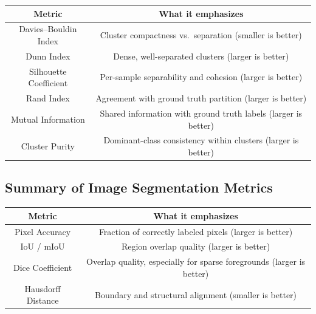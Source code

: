 \documentclass{article}
\begin{document}
\begin{center}
\begin{tabular}{| c | c |}
\hline
\textbf{Metric} & \textbf{What it emphasizes} \\ 
\hline

Davies--Bouldin Index & Cluster compactness vs.\ separation (smaller is better) \\  
\hline

Dunn Index & Dense, well-separated clusters (larger is better) \\
\hline

Silhouette Coefficient & Per-sample separability and cohesion (larger is better) \\
\hline

Rand Index & Agreement with ground truth partition (larger is better) \\
\hline

Mutual Information & Shared information with ground truth labels (larger is better) \\
\hline

Cluster Purity & Dominant-class consistency within clusters (larger is better) \\
\hline

\end{tabular}
\end{center}



\subsection{Summary of Image Segmentation Metrics}

\begin{center}
\begin{tabular}{| c | c |}
\hline
\textbf{Metric} & \textbf{What it emphasizes} \\ 
\hline

Pixel Accuracy & Fraction of correctly labeled pixels (larger is better) \\
\hline

IoU / mIoU & Region overlap quality (larger is better) \\
\hline

Dice Coefficient & Overlap quality, especially for sparse foregrounds (larger is better) \\
\hline

Hausdorff Distance & Boundary and structural alignment (smaller is better) \\
\hline

\end{tabular}
\end{center}
\end{document}
